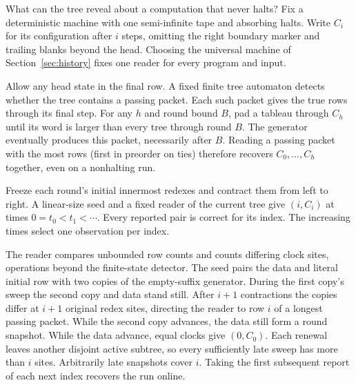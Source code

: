 \label{sec:chronology}
What can the tree reveal about a computation that never halts? Fix a deterministic machine with one semi-infinite tape and absorbing halts. Write $C_i$ for its configuration after $i$ steps, omitting the right boundary marker and trailing blanks beyond the head. Choosing the universal machine of Section~\ref{sec:history} fixes one reader for every program and input.

Allow any head state in the final row. A fixed finite tree automaton detects whether the tree contains a passing packet. Each such packet gives the true rows through its final step. For any $h$ and round bound $B$, pad a tableau through $C_h$ until its word is larger than every tree through round $B$. The generator eventually produces this packet, necessarily after $B$. Reading a passing packet with the most rows (first in preorder on ties) therefore recovers $C_0,\ldots,C_h$ together, even on a nonhalting run.

\begin{samepage}\begin{corollary}\label{cor:chronology}
Freeze each round's initial innermost redexes and contract them from left to right. A linear-size seed and a fixed reader of the current tree give $(i,C_i)$ at times $0=t_0<t_1<\cdots$. Every reported pair is correct for its index. The increasing times select one observation per index.
\end{corollary}\end{samepage}

The reader compares unbounded row counts and counts differing clock sites, operations beyond the finite-state detector. The seed pairs the data and literal initial row with two copies of the empty-suffix generator. During the first copy's sweep the second copy and data stand still. After $i+1$ contractions the copies differ at $i+1$ original redex sites, directing the reader to row $i$ of a longest passing packet. While the second copy advances, the data still form a round snapshot. While the data advance, equal clocks give $(0,C_0)$. Each renewal leaves another disjoint active subtree, so every sufficiently late sweep has more than $i$ sites. Arbitrarily late snapshots cover $i$. Taking the first subsequent report of each next index recovers the run online.

